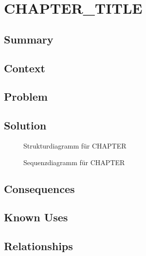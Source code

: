 \chapter{CHAPTER_TITLE}

\section{Summary}
\section{Context}
\section{Problem}
\section{Solution}
\begin{figure}[H]
  \centering
  
  \caption{Strukturdiagramm f\"ur CHAPTER}
\end{figure}
\begin{figure}[H]
  \centering
  
  \caption{Sequenzdiagramm f\"ur CHAPTER}
\end{figure}
\section{Consequences}
\section{Known Uses}
\section{Relationships}

